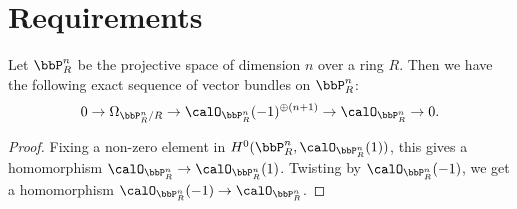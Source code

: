 \section{Requirements}

\begin{proposition}\label{prop:Euler_sequence_on_projective_spaces}
    Let \(\bbP^n_R\) be the projective space of dimension \(n\) over a ring \(R\).
    Then we have the following exact sequence of vector bundles on \(\bbP^n_R\):
    \[ 0 \to \Omega_{\bbP^n_R/R} \to \calO_{\bbP^n_R}(-1)^{\oplus (n+1)} \to \calO_{\bbP^n_R} \to 0. \]
\end{proposition}
\begin{proof}
    Fixing a non-zero element in \(H^0(\bbP^n_R, \calO_{\bbP^n_R}(1))\), this gives a homomorphism \(\calO_{\bbP^n_R} \to \calO_{\bbP^n_R}(1)\).
    Twisting by \(\calO_{\bbP^n_R}(-1)\), we get a homomorphism \(\calO_{\bbP^n_R}(-1) \to \calO_{\bbP^n_R}\).
\end{proof}
